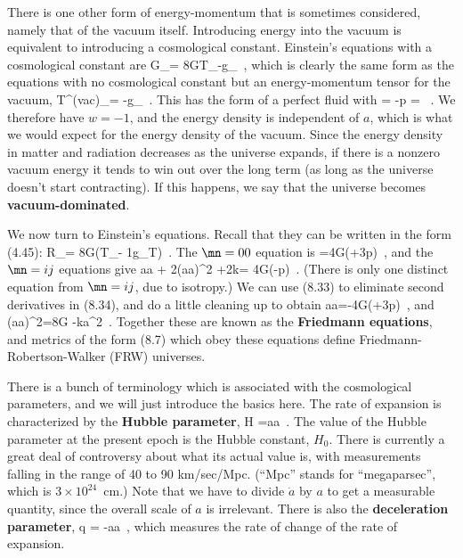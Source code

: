 There is one other form of energy-momentum that is sometimes 
considered, namely that of the vacuum itself.  Introducing energy
into the vacuum is equivalent to introducing a cosmological constant.
Einstein's equations with a cosmological constant are
\be
  G_\mn = 8\pi GT_\mn -\Lambda g_\mn \ ,\label{8.29}
\ee
which is clearly the same form as the equations with no cosmological
constant but an energy-momentum tensor for the vacuum,
\be
  T^{\rm (vac)}_\mn = -{{\Lambda}}g_\mn\ .\label{8.30}
\ee
This has the form of a perfect fluid with
\be
  \rho = -p = {{\Lambda}}\ .\label{8.31}
\ee
We therefore have $w=-1$, and 
the energy density is independent of $a$, which is what
we would expect for the energy density of the vacuum.  Since the
energy density in matter and radiation decreases as the universe
expands, if there is a nonzero vacuum energy it tends to win out over
the long term (as long as the universe doesn't start contracting).
If this happens, we say that the universe becomes {\bf
vacuum-dominated}.

We now turn to Einstein's equations.  Recall that they can be
written in the form (4.45):
\be
  R_\mn = 8\pi G\left(T_\mn - {1}g_\mn T\right)\ .
  \label{8.32}
\ee
The $\mn = 00$ equation is
=4\pi G(\rho+3p)\ ,\label{8.33}
\ee
and the $\mn = ij$ equations give
\be
  {{\ddot a}\over a} + 2\left({{\dot a}\over a}\right)^2
  +2{k}= 4\pi G(\rho-p)\ .\label{8.34}
\ee
(There is only one distinct equation from $\mn = ij$, due to
isotropy.)  We can use (8.33) to eliminate second derivatives in
(8.34), and do a little cleaning up to obtain 
\be
  {{\ddot a}\over a}=-{{4\pi G}}(\rho+3p)\ ,\label{8.35}
\ee
and
\be
  \left({{\dot a}\over a}\right)^2={{8\pi G}}\rho
  -{{k}\over a^2}\ .\label{8.36}
\ee
Together these are known as the {\bf Friedmann equations},
and metrics of the form (8.7) which obey these equations define
Friedmann-Robertson-Walker (FRW) universes.

There is a bunch of terminology which is associated with the
cosmological parameters, and we will just introduce the basics
here.  The rate of expansion is characterized by the {\bf Hubble
parameter},
\be
  H ={{\dot a}\over a}\ .\label{8.37}
\ee
The value of the Hubble parameter at the present epoch is the
Hubble constant, $H_0$.  There is currently a great deal of 
controversy about what its actual value is, with measurements
falling in the range of 40 to 90 km/sec/Mpc.  (``Mpc'' stands for
``megaparsec'', which is $3\times 10^{24}$~cm.)  Note that we
have to divide $\dot a$ by $a$ to get a measurable quantity, since
the overall scale of $a$ is irrelevant.  There is also the
{\bf deceleration parameter},
\be
  q = -{{a\ddot a}}\ ,\label{8.38}
\ee
which measures the rate of change of the rate of expansion.

